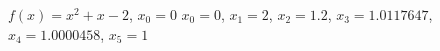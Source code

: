 {$f(x) = x^2+x-2$, $x_0=0$
}
{$x_0=0$, $x_1=2$, $x_2=1.2$, $x_3=1.0117647$, $x_4=1.0000458$, $x_5=1$
}
